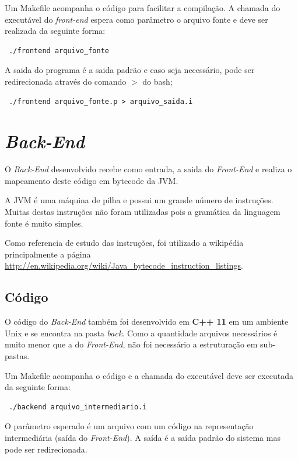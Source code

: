 \documentclass[12pt]{article}
\begin{document}
Um Makefile acompanha o código para facilitar a compilação. A chamada do executável do \textit{front-end} espera como parâmetro o arquivo fonte e deve ser realizada da seguinte forma:

\begin{verbatim}
 ./frontend arquivo_fonte
\end{verbatim}

A saida do programa é a saida padrão e caso seja necessário, pode ser redirecionada através do comando $>$ do bash;

\begin{verbatim}
 ./frontend arquivo_fonte.p > arquivo_saida.i
\end{verbatim}

\section{\textit{Back-End}}
\label{sec:backend}

O \textit{Back-End} desenvolvido recebe como entrada, a saida do \textit{Front-End} e realiza o mapeamento deste código em bytecode da JVM.

A JVM é uma máquina de pilha e possui um grande número de instruções. Muitas destas instruções não foram utilizadas pois a gramática da linguagem fonte é muito simples.

Como referencia de estudo das instruções, foi utilizado a wikipédia principalmente a página \url{http://en.wikipedia.org/wiki/Java_bytecode_instruction_listings}.

\subsection{Código}

O código do \textit{Back-End} também foi desenvolvido em \textbf{C++ 11} em um ambiente Unix e se encontra na pasta \textit{back}. Como a quantidade arquivos necessários é muito menor que a do \textit{Front-End}, não foi necessário a estruturação em sub-pastas.

Um Makefile acompanha o código e a chamada do executável deve ser executada da seguinte forma:

\begin{verbatim}
 ./backend arquivo_intermediario.i
\end{verbatim}

O parâmetro esperado é um arquivo com um código na representação intermediária (saída do \textit{Front-End}). A saída é a saída padrão do sistema mas pode ser redirecionada.
\end{document}
